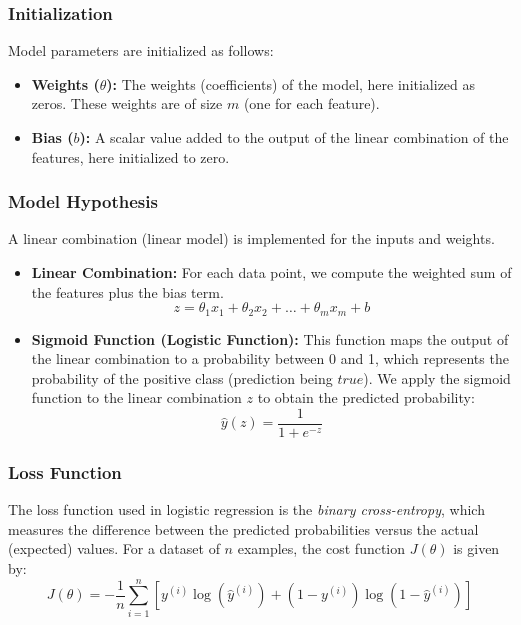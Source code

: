 \documentclass{article}
\theoremstyle{plain}
\theoremstyle{definition}
\theoremstyle{remark}
\begin{document}
\subsubsection{Initialization}

Model parameters are initialized as follows:

\begin{itemize}
\item \textbf{Weights ($\theta$):} The weights (coefficients) of the model, here initialized as zeros. These weights are of size $m$ (one for each feature).

\item \textbf{Bias ($b$):} A scalar value added to the output of the linear combination of the features, here initialized to zero.

\end{itemize}


\subsubsection{Model Hypothesis}

A linear combination (linear model) is implemented for the inputs and weights.

\begin{itemize}

\item \textbf{Linear Combination:} For each data point, we compute the weighted sum of the features plus the bias term.
$$
z = \theta_1 x_1 + \theta_2 x_2 + \dots + \theta_m x_m + b
$$

\item \textbf{Sigmoid Function (Logistic Function):} This function maps the output of the linear combination to a probability between 0 and 1, which represents the probability of the positive class (prediction being $true$). We apply the sigmoid function to the linear combination $z$ to obtain the predicted probability:
$$
\hat{y}(z) = \frac{1}{1 + e^{-z}}
$$

\end{itemize}


\subsubsection{Loss Function}

The loss function used in logistic regression is the \textit{binary cross-entropy}, which measures the difference between the predicted probabilities versus the actual (expected) values. For a dataset of $n$ examples, the cost function $J(\theta)$ is given by:
$$
J(\theta) = -\frac{1}{n} \sum_{i=1}^{n} \left[ y^{(i)} \log(\hat{y}^{(i)}) + (1 - y^{(i)}) \log(1 - \hat{y}^{(i)}) \right]
$$
\end{document}

